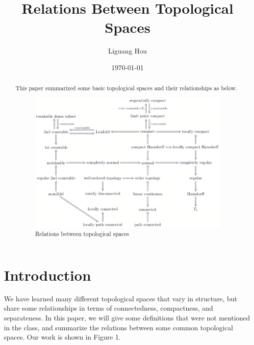 \documentclass[11pt]{diazessay} %
\title{\textbf{Relations Between Topological Spaces} } %
\author{Liguang Hou} %
\date{\today} %
\begin{document}
\maketitle %



\begin{abstract}

	\noindent
	This paper summarized some basic topological spaces and their relationships as below.
	
	\vskip 5pt
	\begin{figure}[h]
		\centering
		\includegraphics[width=1\textwidth]{制图2-vmake.png}
		\caption{Relations between topological spaces}
	\end{figure}
\end{abstract}%

\section*{Introduction}
We have learned many different topological spaces that vary in structure, but share some relationships in terms of connectedness, compactness, and separateness. 
In this paper, we will give some definitions that were not mentioned in the class, and summarize the relations between some common topological spaces. 
Our work is shown in Figure 1.
\end{document}
